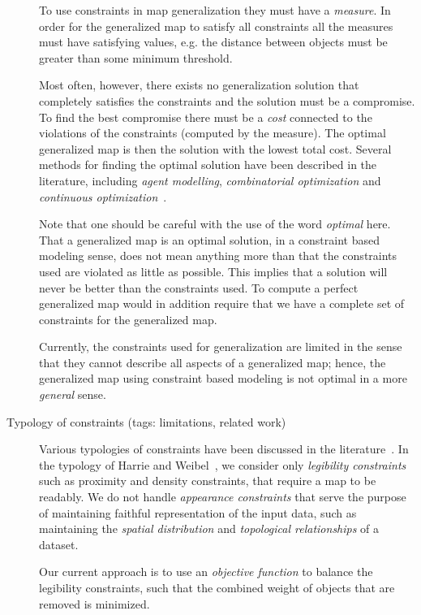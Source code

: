 \documentclass[11pt, oneside]{article}   	%
\begin{document}
\begin{description}
To use constraints in map generalization they must have a \emph{measure}. In order for the generalized map to satisfy all constraints all the measures must have satisfying values, e.g. the distance between objects must be greater than some minimum threshold. 

Most often, however, there exists no generalization solution that completely satisfies the constraints and the solution must be a compromise. To find the best compromise there must be a \emph{cost} connected to the violations of the constraints (computed by the measure). The optimal generalized map is then the solution with the lowest total cost. Several methods for finding the optimal solution have been described in the literature, including \emph{agent modelling}, \emph{combinatorial optimization} and \emph{continuous optimization}~\cite{harrie2007modelling}.

Note that one should be careful with the use of the word \emph{optimal} here. That a generalized map is an optimal solution, in a constraint based modeling sense, does not mean anything more than that the constraints used are violated as little as possible. This implies that a solution will never be better than the constraints used. To compute a perfect generalized map would in addition require that we have a complete set of constraints for the generalized map. 

Currently, the constraints used for generalization are limited in the sense that they cannot describe all aspects of a generalized map; hence, the generalized map using constraint based modeling is not optimal in a more \emph{general} sense.

\item[Typology of constraints (tags: limitations, related work)] Various typologies of constraints have been discussed in the literature~\cite{beard1991constraints,harrie2007modelling}. In the typology of Harrie and Weibel~\cite{harrie2007modelling}, we consider only \emph{legibility constraints} such as proximity and density constraints, that require a map to be readably. We do not handle \emph{appearance constraints} that serve the purpose of maintaining faithful representation of the input data, such as maintaining the \emph{spatial distribution} and \emph{topological relationships} of a dataset.

Our current approach is to use an \emph{objective function} to balance the legibility constraints, such that the combined weight of objects that are removed is minimized. 


\end{description}
\end{document}

